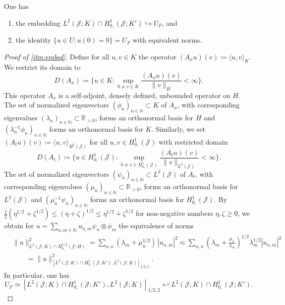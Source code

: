 \documentclass{amsart}
\newcommand{\cJ}{\mathcal J}
\begin{document}
\begin{lemma}[Embedding]\label{lem:Embedding}
One has 
\begin{enumerate}
\item the embedding $L^2(\cJ;K) \cap H^1_{0,}(\cJ;K') \hookrightarrow U_F$, and \label{itm:embed}
\item the identity $\lbrace u \in U\colon u(0) = 0\rbrace = U_F$ with equivalent norms. \label{itm:ident}
\end{enumerate}
\end{lemma}
\begin{proof}[Proof of \ref{itm:embed}]
Define for all $u,v\in K$ the operator $(A_x u)(v)\coloneqq \langle u,v\rangle_K$. We restrict its domain to 
\begin{equation*}
D(A_x)\coloneqq \Big\{u \in K\colon \sup_{0 \neq v \in K} \frac{(A_x u)(v)}{\|v\|_H}<\infty\Big\}.
\end{equation*}
This operator $A_x$ is a self-adjoint, densely defined, unbounded operator on $H$.
The set of normalized eigenvectors $(\phi_n)_{n \in \mathbb{N}} \subset K$ of $A_x$, with corresponding eigenvalues $(\lambda_n)_{n\in \mathbb{N}} \subset \mathbb{R}_{>0}$, forms an orthonormal basis for $H$ and 
$(\lambda_n^{-1} \phi_n)_{n\in \mathbb{N}}$ forms an orthonormal basis for $K$. 
Similarly, we set $(A_t u)(v)\coloneqq \langle u,v\rangle_{H^1(\cJ)}$ for all $u,v \in H_{0,}^1(\cJ)$ with restricted domain 
\begin{equation*}
D(A_t)\coloneqq \Big\{u \in H_{0,}^1(\cJ)\colon \sup_{0 \neq v \in H_{0,}^1(\cJ)} \frac{(A_t u)(v)}{\|v\|_{L^2(\cJ)}}<\infty\Big\}.
\end{equation*}
The set of normalized eigenvectors $(\psi_n)_{n\in \mathbb{N}} \subset L^2(\cJ)$ of $A_t$, with corresponding eigenvalues $(\mu_n)_{n\in \mathbb{N}} \subset \mathbb{R}_{>0}$, forms an orthonormal basis for $L^2(\cJ)$ and $(\mu_n^{-1} \psi_n)_{n\in \mathbb{N}}$ forms an orthonormal basis for $H_{0,}^1(\cJ)$. 
%
By $\frac12(\eta^{1/2}+\zeta^{1/2}) \leq (\eta+\zeta)^{1/2}\leq \eta^{1/2}+\zeta^{1/2}$ for non-negative numbers $\eta,\zeta\geq 0$,
we obtain for $u=\sum_{n,m \in \mathbb{N}} u_{n,m} \psi_n \otimes \phi_m$ the equivalence of norms
\begin{align*}
&\|u\|^2_{L^2(\cJ;K) \cap H_{0,}^{1/2}(\cJ;H)} =
\sum_{n,n} (\lambda_m +\mu_n^{1/2})\, |u_{n,m}|^2 \eqsim \sum_{n,n}  \left(\lambda_m +\frac{\mu_n}{\lambda_m}\right)^{1/2} \lambda_m^{1/2} |u_{n,m}|^2 \\
 &\qquad =
\|u\|^2_{[L^2(\cJ;K)\cap H_{0,}^1(\cJ;K'),L^2(\cJ;K)]_{1/2,2}}.
\end{align*}
In particular, one has 
\begin{equation*}
U_F \simeq [L^2(\cJ;K)\cap H_{0,}^1(\cJ;K'),L^2(\cJ;K)]_{1/2,2}  \hookleftarrow L^2(\cJ;K) \cap H^1_{0,}(\cJ;K').
\end{equation*} 


\end{proof}
\end{document}

